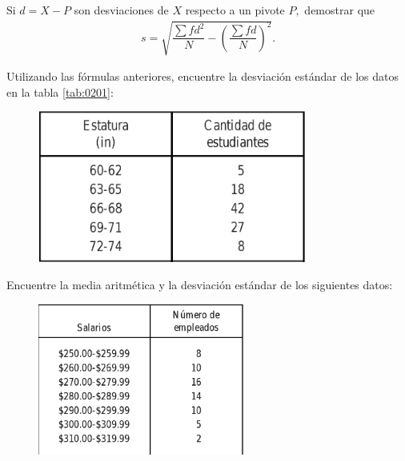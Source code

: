  

 
  \begin{problema}
   \label{problema:4.15}
 Si $d=X-P$ son desviaciones de $X$ respecto a un pivote $P,$ demostrar que
 \begin{align}
 s=\sqrt{\dfrac{\sum fd^{2}}{N}-\left( \dfrac{\sum fd}{N} \right)^{2}}.
 \end{align}
  \end{problema}
 

 
 \begin{problema}
  \label{problema:4.17}
  Utilizando las fórmulas anteriores, encuentre la desviación estándar de los datos en la tabla \ref{tab:0201}:
   \begin{figure}[ht]
  \centering
  \includegraphics[height=5cm,keepaspectratio=true]{./images/tab0201.png}
 \end{figure}

 \end{problema}

 

 
  \begin{problema}
   \label{problema:4.18}
 	Encuentre la media aritmética y  la desviación estándar de los siguientes datos:
 	\begin{figure}[ht]
  \centering
  \includegraphics[height=5cm]{./images/tab0205.png}
  \label{tab:0205}
 \end{figure}

  \end{problema}
 

